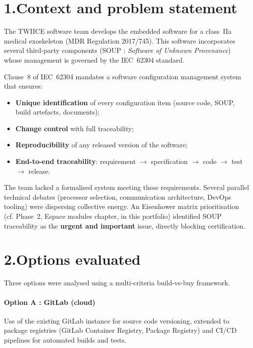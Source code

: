 \bigskip

\section*{1.\quad Context and problem statement}

The TWIICE software team develops the embedded software for a class~IIa medical exoskeleton (MDR Regulation 2017/745). This software incorporates several third-party components (SOUP : \textit{Software of Unknown Provenance}) whose management is governed by the IEC~62304 standard.

Clause~8 of IEC~62304 mandates a software configuration management system that ensures:

\begin{itemize}
  \item \textbf{Unique identification} of every configuration item (source code, SOUP, build artefacts, documents);
  \item \textbf{Change control} with full traceability;
  \item \textbf{Reproducibility} of any released version of the software;
  \item \textbf{End-to-end traceability}: requirement $\rightarrow$ specification $\rightarrow$ code $\rightarrow$ test $\rightarrow$ release.
\end{itemize}

The team lacked a formalised system meeting these requirements. Several parallel technical debates (processor selection, communication architecture, DevOps tooling) were dispersing collective energy. An Eisenhower matrix prioritisation (cf. Phase~2, Espace modules chapter, in this portfolio) identified SOUP traceability as the \textbf{urgent and important} issue, directly blocking certification.

\section*{2.\quad Options evaluated}

Three options were analysed using a multi-criteria build-vs-buy framework.

\paragraph{Option A : GitLab (cloud)}
Use of the existing GitLab instance for source code versioning, extended to package registries (GitLab Container Registry, Package Registry) and CI/CD pipelines for automated builds and tests.

